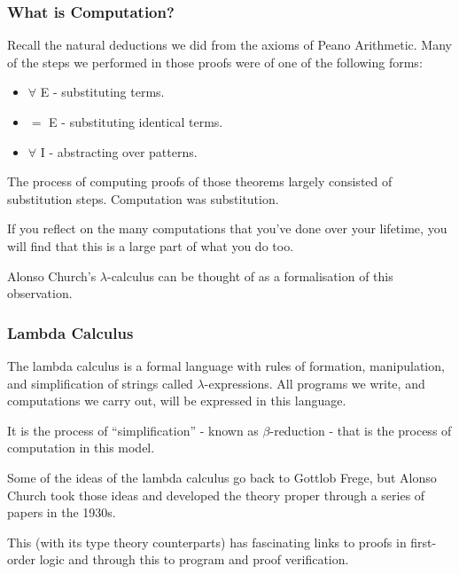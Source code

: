 \documentclass{beamer}
\begin{document}
\begin{frame}
	\frametitle{What is Computation?}

	Recall the natural deductions we did from the axioms of Peano Arithmetic. Many of the steps we performed in those proofs were of one of the following forms: 

		\begin{itemize}
			\item $\forall$ E - substituting terms.
			\item $=$ E - substituting identical terms.
			\item $\forall$ I - abstracting over patterns. 
		\end{itemize}

	The process of computing proofs of those theorems largely consisted of substitution steps. Computation was substitution. 

	If you reflect on the many computations that you've done over your lifetime, you will find that this is a large part of what you do too.

	Alonso Church's $\lambda$-calculus can be thought of as a formalisation of this observation. 


\end{frame}

\begin{frame}
	\frametitle{Lambda Calculus}

	The lambda calculus is a formal language with rules of formation, manipulation, and simplification of strings called $\lambda$-expressions. All programs we write, and computations we carry out, will be expressed in this language. 

	\vspace{0.5cm}

	It is the process of ``simplification'' - known as $\beta$-reduction - that is the process of computation in this model.
	
	\vspace{0.5cm}

	Some of the ideas of the lambda calculus go back to Gottlob Frege, but Alonso Church took those ideas and developed the theory proper through a series of papers in the 1930s. 

	\vspace{0.5cm}

	This (with its type theory counterparts) has fascinating links to proofs in first-order logic and through this to program and proof verification.

\end{frame}
\end{document}
